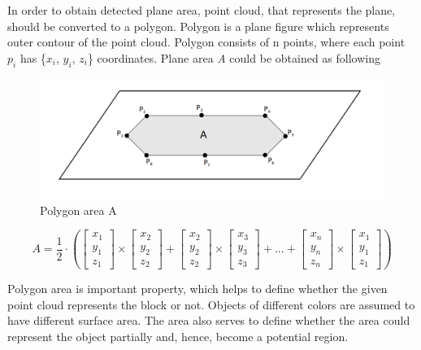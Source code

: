 \documentclass{ctuthesis}
\begin{document}
In order to obtain detected plane area, point cloud, that represents the plane, should be converted to a polygon. Polygon is a plane figure which represents outer contour of the point cloud. Polygon consists of n points, where each point \emph{$p_i$} has \{$x_i$, $y_i$, $z_i$\} coordinates. Plane area \emph{A} could be obtained as following

\begin{figure}[htbp]
    \centering
    \includegraphics[width=\textwidth]{poly-area.png}
    \caption{Polygon area A}
    \label{fig:poly_area}
\end{figure}

\[ A = \frac{1}{2} \cdot ( \begin{bmatrix}
x_1\\
y_1\\
z_1
\end{bmatrix} \times \begin{bmatrix}
x_2\\
y_2\\
z_2
\end{bmatrix} + \begin{bmatrix}
x_2\\
y_2\\
z_2
\end{bmatrix} \times \begin{bmatrix}
x_3\\
y_3\\
z_3
\end{bmatrix} + ... + \begin{bmatrix}
x_n\\
y_n\\
z_n
\end{bmatrix} \times \begin{bmatrix}
x_1\\
y_1\\
z_1
\end{bmatrix} )  \]

Polygon area is important property, which helps to define whether the given point cloud represents the block or not. Objects of different colors are assumed to have different surface area. The area also serves to define whether the area could represent the object partially and, hence, become a potential region.
\end{document}
